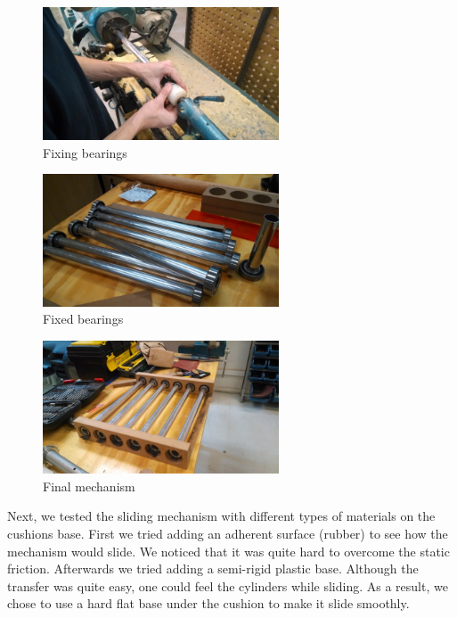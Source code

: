 \begin{figure}[h]
\centering
\includegraphics[width=7cm]{brazil_images/image040.jpg}
\caption{Fixing bearings}
\label{fig:fixing_bearings}
\end{figure}


\begin{figure}[h]
\centering
\includegraphics[width=7cm]{brazil_images/image041.jpg}
\caption{Fixed bearings}
\label{fig:fixed}
\end{figure}

\begin{figure}[h]
\centering
\includegraphics[width=7cm]{brazil_images/image042.jpg}
\caption{Final mechanism}
\label{fig:final_mechanism}
\end{figure}

Next, we tested the sliding mechanism with different types of materials on the cushions base. First we tried adding an adherent surface (rubber) to see how the mechanism would slide. We noticed that it was quite hard to overcome the static friction. Afterwards we tried adding a semi-rigid plastic base. Although the transfer was quite easy, one could feel the cylinders while sliding. As a result, we chose to use a hard flat base under the cushion to make it slide smoothly.   \\


